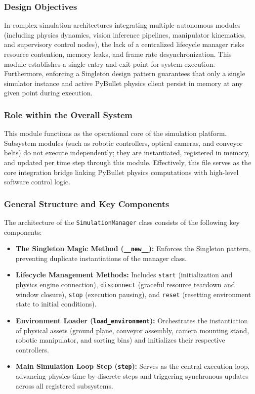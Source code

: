 \documentclass{article}
\begin{document}
\subsubsection{Design Objectives}
In complex simulation architectures integrating multiple autonomous modules (including physics dynamics, vision inference pipelines, manipulator kinematics, and supervisory control nodes), the lack of a centralized lifecycle manager risks resource contention, memory leaks, and frame rate desynchronization. This module establishes a single entry and exit point for system execution. Furthermore, enforcing a Singleton design pattern guarantees that only a single simulator instance and active PyBullet physics client persist in memory at any given point during execution.

\subsubsection{Role within the Overall System}
This module functions as the operational core of the simulation platform. Subsystem modules (such as robotic controllers, optical cameras, and conveyor belts) do not execute independently; they are instantiated, registered in memory, and updated per time step through this module. Effectively, this file serves as the core integration bridge linking PyBullet physics computations with high-level software control logic.

\subsubsection{General Structure and Key Components}
The architecture of the \texttt{SimulationManager} class consists of the following key components:

\begin{itemize}
	\item \textbf{The Singleton Magic Method (\texttt{\_\_new\_\_}):} Enforces the Singleton pattern, preventing duplicate instantiations of the manager class.
	\item \textbf{Lifecycle Management Methods:} Includes \texttt{start} (initialization and physics engine connection), \texttt{disconnect} (graceful resource teardown and window closure), \texttt{stop} (execution pausing), and \texttt{reset} (resetting environment state to initial conditions).
	\item \textbf{Environment Loader (\texttt{load\_environment}):} Orchestrates the instantiation of physical assets (ground plane, conveyor assembly, camera mounting stand, robotic manipulator, and sorting bins) and initializes their respective controllers.
	\item \textbf{Main Simulation Loop Step (\texttt{step}):} Serves as the central execution loop, advancing physics time by discrete steps and triggering synchronous updates across all registered subsystems.
\end{itemize}
\end{document}
